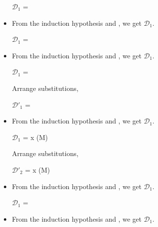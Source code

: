 \begin{itemize}
	      $\mathcal{D}_1$ = 
	      {}

	\item \QTrans

	      From the induction hypothesis and \QTrans, we get $\mathcal{D}_1$.

	      $\mathcal{D}_1$ = 
	      { \andalso {}}

	\item \QBeta

	      From the induction hypothesis and \QBeta, we get $\mathcal{D}_1$.

	      $\mathcal{D}_1$ = 
	      { \andalso {}}

	      Arrange substitutions,

	      $\mathcal{D}'_1$ = 
	      { \andalso {}}

	\item \QEta

	      From the induction hypothesis and \QEta, we get $\mathcal{D}_1$.

	      $\mathcal{D}_1$ = 
	      { \andalso x \notin \FV(M\SB)}

	      Arrange substitutions,

	      $\mathcal{D}'_2$ = 
	      { \andalso x \notin \FV(M\SB)}

	\item \QTBLTB

	      From the induction hypothesis and \QTBLTB, we get $\mathcal{D}_1$.

	      $\mathcal{D}_1$ = 
	      {}

	\item \QLambda

	      From the induction hypothesis and \QLambda, we get $\mathcal{D}_1$.


\end{itemize}
